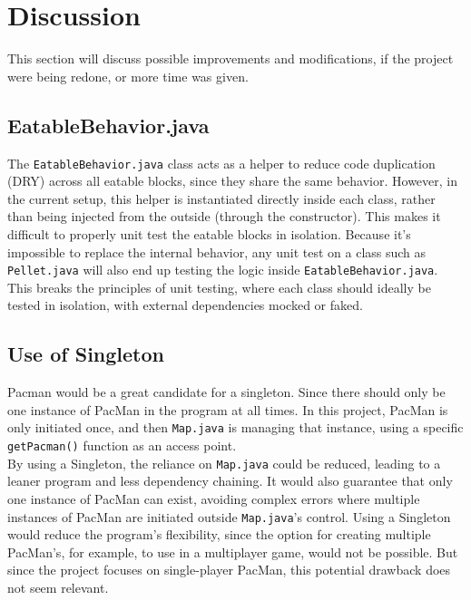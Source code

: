 \documentclass[a4paper,5pt]{article}
\begin{document}
\section{Discussion}
This section will discuss possible improvements and modifications, if the project were being redone, or more time was given.
\subsection{EatableBehavior.java}
The \texttt{EatableBehavior.java} class acts as a helper to reduce code duplication (DRY) across all eatable blocks, since they share the same behavior. However, in the current setup, this helper is instantiated directly inside each class, rather than being injected from the outside (through the constructor). This makes it difficult to properly unit test the eatable blocks in isolation. Because it's impossible to replace the internal behavior, any unit test on a class such as \texttt{Pellet.java} will also end up testing the logic inside \texttt{EatableBehavior.java}. This breaks the principles of unit testing, where each class should ideally be tested in isolation, with external dependencies mocked or faked.

\subsection{Use of Singleton}
Pacman would be a great candidate for a singleton. Since there should only be one instance of PacMan in the program at all times. In this project, PacMan is only initiated once, and then \texttt{Map.java} is managing that instance, using a specific \texttt{getPacman()} function as an access point. \\ 
By using a Singleton, the reliance on \texttt{Map.java} could be reduced, leading to a leaner program and less dependency chaining. It would also guarantee that only one instance of PacMan can exist, avoiding complex errors where multiple instances of PacMan are initiated outside \texttt{Map.java}'s control. Using a Singleton would reduce the program's flexibility, since the option for creating multiple PacMan's, for example, to use in a multiplayer game, would not be possible. But since the project focuses on single-player PacMan, this potential drawback does not seem relevant.
\end{document}
